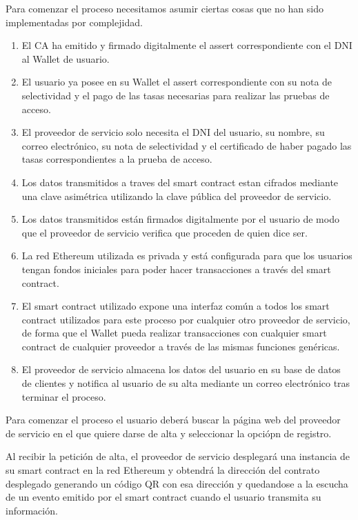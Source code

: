 \documentclass[12pt]{report}
\begin{document}
Para comenzar el proceso necesitamos asumir ciertas cosas que no han sido implementadas por complejidad.
\begin{enumerate}
\item El CA ha emitido y firmado digitalmente el assert correspondiente con el DNI al Wallet de usuario.
\item El usuario ya posee en su Wallet el assert correspondiente con su nota de selectividad y el pago de las tasas necesarias para realizar las pruebas de acceso.
\item El proveedor de servicio solo necesita el DNI del usuario, su nombre, su correo electrónico, su nota de selectividad y el certificado de haber pagado las tasas correspondientes a la prueba de acceso.
\item Los datos transmitidos a traves del smart contract estan cifrados mediante una clave asimétrica utilizando la clave pública del proveedor de servicio.
\item Los datos transmitidos están firmados digitalmente por el usuario de modo que el proveedor de servicio verifica que proceden de quien dice ser.
\item La red Ethereum utilizada es privada y está configurada para que los usuarios tengan fondos iniciales para poder hacer transacciones a través del smart contract.

\item El smart contract utilizado expone una interfaz común a todos los smart contract utilizados para este proceso por cualquier otro proveedor de servicio, de forma que el Wallet pueda realizar transacciones con cualquier smart contract de cualquier proveedor a través de las mismas funciones genéricas.
\item El proveedor de servicio almacena los datos del usuario en su base de datos de clientes y notifica al usuario de su alta mediante un correo electrónico tras terminar el proceso.

\end{enumerate}
 
Para comenzar el proceso el usuario deberá buscar la página web del proveedor de servicio en el que quiere darse de alta y seleccionar la opciópn de registro.

Al recibir la petición de alta, el proveedor de servicio desplegará una instancia de su smart contract en la red Ethereum y obtendrá la dirección del contrato desplegado generando un código QR con esa dirección y quedandose a la escucha de un evento emitido por el smart contract cuando el usuario transmita su información.
\end{document}
